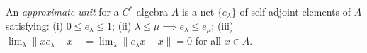 An \emph{approximate unit} for a $C^*$-algebra $A$ is a net $\{e_\lambda\}$ of self-adjoint elements of $A$ satisfying: (i) $0 \leqslant e_\lambda \leqslant 1$; (ii) $\lambda \leqslant \mu \implies e_\lambda \leqslant e_\mu$; (iii) $\lim_\lambda \|x e_\lambda - x\| = \lim_\lambda \|e_\lambda x - x\| = 0$ for all $x \in A$.
